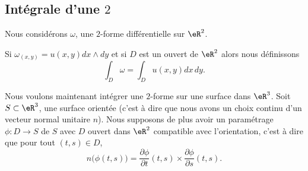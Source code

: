 \subsection{Intégrale d'une \( 2\)}

Nous considérons \( \omega\), une \( 2\)-forme différentielle sur \( \eR^2\).
\begin{definition}
    Si \( \omega_{(x,y)}=u(x,y)dx\wedge dy\) et si \( D\) est un ouvert de \( \eR^2\) alors nous définissons
    \begin{equation}
        \int_D\omega=\int_D u(x,y)dx\,dy.
    \end{equation}
\end{definition}

Nous voulons maintenant intégrer une \( 2\)-forme sur une surface dans \( \eR^3\). Soit \( S\subset \eR^3\), une surface orientée (c'est à dire que nous avons un choix continu d'un vecteur normal unitaire \( n\)). Nous supposons de plus avoir un paramétrage \( \phi\colon D\to S\) de \( S\) avec \( D\) ouvert dans \( \eR^2\) compatible avec l'orientation, c'est à dire que pour tout \( (t,s)\in D\),
\begin{equation}
    n\big( \phi(t,s) \big)=\frac{ \partial \phi }{ \partial t }(t,s)\times \frac{ \partial \phi }{ \partial s }(t,s).
\end{equation}

